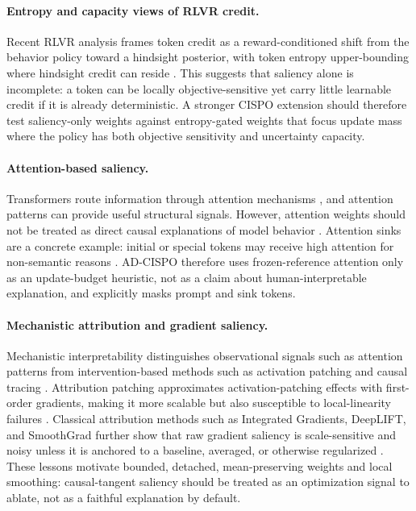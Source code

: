 \documentclass[11pt]{article}
\begin{document}
\paragraph{Entropy and capacity views of RLVR credit.}
Recent RLVR analysis frames token credit as a reward-conditioned shift from the
behavior policy toward a hindsight posterior, with token entropy upper-bounding
where hindsight credit can reside \cite{he2026hindsightcredit}. This suggests
that saliency alone is incomplete: a token can be locally objective-sensitive
yet carry little learnable credit if it is already deterministic. A stronger
CISPO extension should therefore test saliency-only weights against
entropy-gated weights that focus update mass where the policy has both
objective sensitivity and uncertainty capacity.

\paragraph{Attention-based saliency.}
Transformers route information through attention mechanisms
\cite{vaswani2017attention}, and attention patterns can provide useful
structural signals. However, attention weights should not be treated as direct
causal explanations of model behavior \cite{jain2019attention}. Attention
sinks are a concrete example: initial or special tokens may receive high
attention for non-semantic reasons \cite{xiao2024streamingllm}. AD-CISPO
therefore uses frozen-reference attention only as an update-budget heuristic,
not as a claim about human-interpretable explanation, and explicitly masks
prompt and sink tokens.

\paragraph{Mechanistic attribution and gradient saliency.}
Mechanistic interpretability distinguishes observational signals such as
attention patterns from intervention-based methods such as activation patching
and causal tracing \cite{meng2022rome,wang2022ioi}. Attribution patching
approximates activation-patching effects with first-order gradients, making it
more scalable but also susceptible to local-linearity failures
\cite{syed2023attribution,kramar2024atpstar}. Classical attribution methods
such as Integrated Gradients, DeepLIFT, and SmoothGrad further show that raw
gradient saliency is scale-sensitive and noisy unless it is anchored to a
baseline, averaged, or otherwise regularized
\cite{sundararajan2017ig,shrikumar2017deeplift,smilkov2017smoothgrad}. These
lessons motivate bounded, detached, mean-preserving weights and local smoothing:
causal-tangent saliency should be treated as an optimization signal to ablate,
not as a faithful explanation by default.
\end{document}
